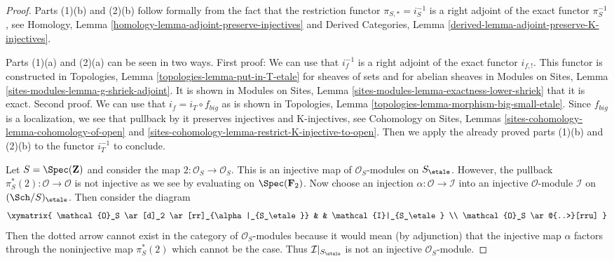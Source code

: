 \begin{proof}
Parts (1)(b) and (2)(b)
follow formally from the fact that the restriction functor
$\pi_{S, *} = i_S^{-1}$ is a right adjoint of the exact functor
$\pi_S^{-1}$, see
Homology, Lemma \ref{homology-lemma-adjoint-preserve-injectives} and
Derived Categories, Lemma \ref{derived-lemma-adjoint-preserve-K-injectives}.

\medskip\noindent
Parts (1)(a) and (2)(a) can be seen in two ways. First proof: We can use
that $i_f^{-1}$ is a right adjoint of the exact functor $i_{f, !}$.
This functor is constructed in
Topologies, Lemma \ref{topologies-lemma-put-in-T-etale}
for sheaves of sets and for abelian sheaves in
Modules on Sites, Lemma \ref{sites-modules-lemma-g-shriek-adjoint}.
It is shown in Modules on Sites, Lemma
\ref{sites-modules-lemma-exactness-lower-shriek} that it is exact.
Second proof. We can use that $i_f = i_T \circ f_{big}$ as is shown
in Topologies, Lemma \ref{topologies-lemma-morphism-big-small-etale}.
Since $f_{big}$ is a localization, we see that pullback by it
preserves injectives and K-injectives, see
Cohomology on Sites, Lemmas \ref{sites-cohomology-lemma-cohomology-of-open} and
\ref{sites-cohomology-lemma-restrict-K-injective-to-open}.
Then we apply the already proved parts (1)(b) and (2)(b)
to the functor $i_T^{-1}$ to conclude.

\medskip\noindent
Let $S = \Spec(\mathbf{Z})$ and consider the map
$2 : \mathcal{O}_S \to \mathcal{O}_S$. This is an injective map
of $\mathcal{O}_S$-modules on $S_\etale$. However, the pullback
$\pi_S^*(2) : \mathcal{O} \to \mathcal{O}$ is not injective
as we see by evaluating on $\Spec(\mathbf{F}_2)$. Now choose
an injection $\alpha : \mathcal{O} \to \mathcal{I}$ into an injective
$\mathcal{O}$-module $\mathcal{I}$ on $(\Sch/S)_\etale$.
Then consider the diagram
$$
\xymatrix{
\mathcal{O}_S \ar[d]_2 \ar[rr]_{\alpha|_{S_\etale}} & &
\mathcal{I}|_{S_\etale} \\
\mathcal{O}_S \ar@{..>}[rru]
}
$$
Then the dotted arrow cannot exist in the category of $\mathcal{O}_S$-modules
because it would mean
(by adjunction) that the injective map $\alpha$ factors through
the noninjective map $\pi_S^*(2)$ which cannot be the case.
Thus $\mathcal{I}|_{S_\etale}$ is not an injective $\mathcal{O}_S$-module.
\end{proof}

